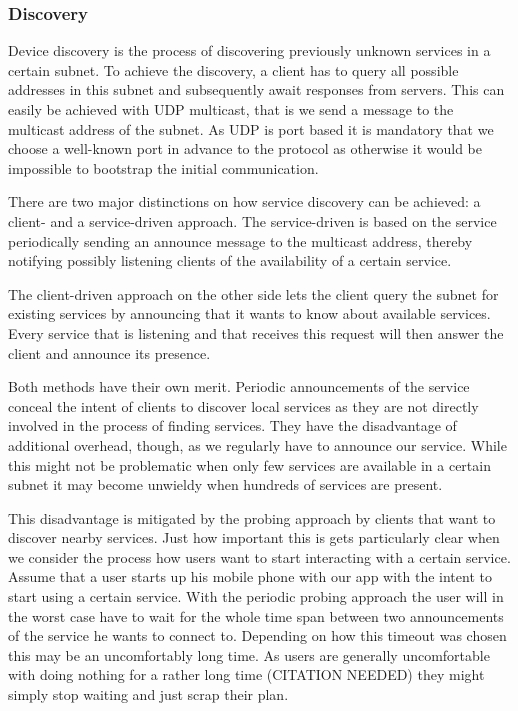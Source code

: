 \subsubsection{Discovery}

Device discovery is the process of discovering previously unknown services in a certain subnet.
To achieve the discovery, a client has to query all possible addresses in this subnet and subsequently await responses from servers.
This can easily be achieved with UDP multicast, that is we send a message to the multicast address of the subnet.
As UDP is port based it is mandatory that we choose a well-known port in advance to the protocol as otherwise it would be impossible to bootstrap the initial communication.

There are two major distinctions on how service discovery can be achieved: a client- and a service-driven approach.
The service-driven is based on the service periodically sending an announce message to the multicast address, thereby notifying possibly listening clients of the availability of a certain service.

The client-driven approach on the other side lets the client query the subnet for existing services by announcing that it wants to know about available services.
Every service that is listening and that receives this request will then answer the client and announce its presence.

Both methods have their own merit.
Periodic announcements of the service conceal the intent of clients to discover local services as they are not directly involved in the process of finding services.
They have the disadvantage of additional overhead, though, as we regularly have to announce our service.
While this might not be problematic when only few services are available in a certain subnet it may become unwieldy when hundreds of services are present.

This disadvantage is mitigated by the probing approach by clients that want to discover nearby services.
Just how important this is gets particularly clear when we consider the process how users want to start interacting with a certain service.
Assume that a user starts up his mobile phone with our app with the intent to start using a certain service.
With the periodic probing approach the user will in the worst case have to wait for the whole time span between two announcements of the service he wants to connect to.
Depending on how this timeout was chosen this may be an uncomfortably long time.
As users are generally uncomfortable with doing nothing for a rather long time (CITATION NEEDED) they might simply stop waiting and just scrap their plan.

